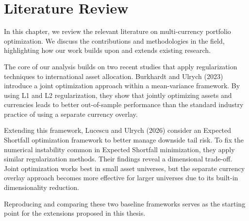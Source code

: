 \chapter{Literature Review}

In this chapter, we review the relevant literature on multi-currency 
portfolio optimization. We discuss the contributions and 
methodologies in the field, highlighting how our work builds 
upon and extends existing research. 

The core of our analysis builds on two recent studies that 
apply regularization techniques to international asset allocation. 
Burkhardt and Ulrych (2023) introduce a joint optimization approach 
within a mean-variance framework. By using L1 and L2 regularization, they show that jointly optimizing assets and 
currencies leads to better out-of-sample performance than the standard 
industry practice of using a separate currency overlay. 

Extending this framework, Lucescu and Ulrych (2026) consider an 
Expected Shortfall optimization framework to better manage downside 
tail risk. To fix the numerical instability common in Expected Shortfall minimization, 
they apply similar regularization methods. Their findings reveal a 
dimensional trade-off. Joint optimization works best in small asset universes, 
but the separate currency overlay approach becomes more effective for larger 
universes due to its built-in dimensionality reduction. 

Reproducing and comparing these two baseline frameworks serves as the starting point 
for the extensions proposed in this thesis.
